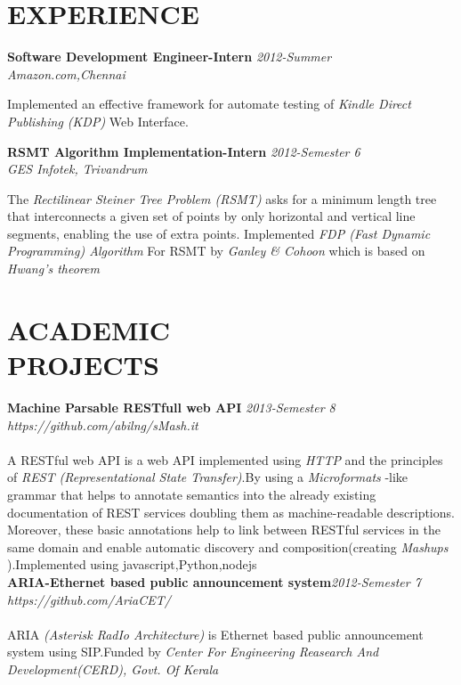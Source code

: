 \documentclass[line,margin]{res}
\begin{document}
\begin{resume}
	  \section{EXPERIENCE}
		  {\bf Software Development Engineer-Intern }\hfill {\it 2012-Summer } \\
		  {\it Amazon.com,Chennai }
		  
		  Implemented an effective framework for automate testing of {\it Kindle Direct Publishing (KDP)} Web Interface.
		  
		  {\bf RSMT Algorithm Implementation-Intern }\hfill {\it 2012-Semester 6 } \\
		  {\it GES Infotek, Trivandrum }
		  
		  The {\it Rectilinear Steiner Tree Problem (RSMT)} asks for a minimum length tree that interconnects a given set of points by only horizontal and vertical line segments, enabling the use of extra points. Implemented {\it FDP (Fast Dynamic Programming) Algorithm } For RSMT by {\it Ganley \& Cohoon } which is based on {\it Hwang’s theorem}\\

\pagebreak 
	  \section{ACADEMIC \\ PROJECTS}
	    	  {\bf Machine Parsable RESTfull web API }\hfill {\it 2013-Semester 8}\\
	          {\it https://github.com/abilng/sMash.it}\\\\
	    	  A RESTful web API is a web API implemented using {\it HTTP }and the principles of {\it REST (Representational State Transfer)}.By using  a {\it Microformats }-like grammar that helps to annotate semantics into the already existing documentation of REST services doubling them as machine-readable descriptions. Moreover, these basic annotations help to link between RESTful services in the same domain and enable automatic discovery and composition(creating {\it Mashups }).Implemented using javascript,Python,nodejs\\

	    	  {\bf ARIA-Ethernet based public announcement system}\hfill {\it 2012-Semester 7}\\
	          {\it https://github.com/AriaCET/}\\\\
	    	  ARIA {\it (Asterisk RadIo Architecture)} is Ethernet based public announcement system using SIP.Funded by {\it Center For Engineering Reasearch And Development(CERD), Govt. Of Kerala}\\
	                          

\end{resume}
\end{document}
